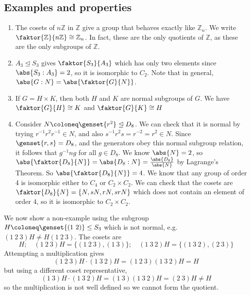\subsection{Examples and properties}
\begin{enumerate}
	\item The cosets of \(n\mathbb Z\) in \(\mathbb Z\) give a group that behaves exactly like \(\mathbb Z_n\).
	      We write \(\faktor{\mathbb Z}{n\mathbb Z} \cong \mathbb Z_n\).
	      In fact, these are the only quotients of \(\mathbb Z\), as these are the only subgroups of \(\mathbb Z\).
	\item \(A_3 \trianglelefteq S_3\) gives \(\faktor{S_3}{A_3}\) which has only two elements since \(\abs{S_3 : A_3} = 2\), so it is isomorphic to \(C_2\).
	      Note that in general, \(\abs{G:N} = \abs{\faktor{G}{N}}\).
	\item If \(G = H \times K\), then both \(H\) and \(K\) are normal subgroups of \(G\).
	      We have \(\faktor{G}{H} \cong K\) and \(\faktor{G}{K} \cong H\) %
	\item Consider \(N \coloneq \genset{r^2} \trianglelefteq D_8\).
	      We can check that it is normal by trying \(r^{-1}r^2r^{-1} \in N\), and also \(s^{-1}r^2s = r^{-2} = r^2 \in N\).
	      Since \(\genset{r, s} = D_8\), and the generators obey this normal subgroup relation, it follows that \(g^{-1}ng\) for all \(g \in D_8\).
	      We know \(\abs{N} = 2\), so \(\abs{\faktor{D_8}{N}} = \abs{D_8 : N} = \frac{\abs{D_8}}{\abs{N}}\) by Lagrange's Theorem.
	      So \(\abs{\faktor{D_8}{N}} = 4\).
	      We know that any group of order 4 is isomorphic either to \(C_4\) or \(C_2 \times C_2\).
	      We can check that the cosets are \(\faktor{D_8}{N} = \{ N, sN, rN, srN \}\) which does not contain an element of order 4, so it is isomorphic to \(C_2 \times C_2\).
\end{enumerate}
We now show a non-example using the subgroup \(H \coloneq \genset{(1\ 2)} \leq S_3\) which is not normal, e.g.
\((1\ 2\ 3) H \neq H (1\ 2\ 3)\).
The cosets are
\[
	H;\quad (1\ 2\ 3)H = \{(1\ 2\ 3), (1\ 3)\};\quad (1\ 3\ 2)H = \{(1\ 3\ 2), (2\ 3)\}
\]
Attempting a multiplication gives
\[
	(1\ 2\ 3)H \cdot (1\ 3\ 2) H = (1\ 2\ 3) (1\ 3\ 2) H = H
\]
but using a different coset representative,
\[
	(1\ 3)H \cdot (1\ 3\ 2) H = (1\ 3)(1\ 3\ 2) H = (2\ 3)H \neq H
\]
so the multiplication is not well defined so we cannot form the quotient.

